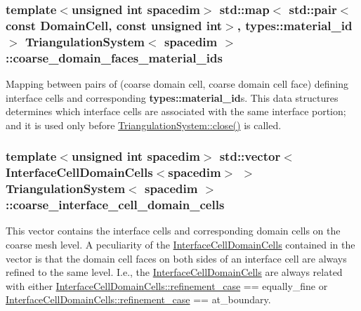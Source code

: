 \subsubsection[{\texorpdfstring{coarse\+\_\+domain\+\_\+faces\+\_\+material\+\_\+ids}{coarse_domain_faces_material_ids}}]{\setlength{\rightskip}{0pt plus 5cm}template$<$unsigned int spacedim$>$ std\+::map$<$ std\+::pair$<$const {\bf Domain\+Cell}, const unsigned int$>$, {\bf types\+::material\+\_\+id} $>$ {\bf Triangulation\+System}$<$ spacedim $>$\+::coarse\+\_\+domain\+\_\+faces\+\_\+material\+\_\+ids\hspace{0.3cm}{\ttfamily [private]}}\hypertarget{class_triangulation_system_a9a14a8a68bda679330a169413f0e2dfb}{}\label{class_triangulation_system_a9a14a8a68bda679330a169413f0e2dfb}
Mapping between pairs of (coarse domain cell, coarse domain cell face) defining interface cells and corresponding {\bf types\+::material\+\_\+id}s. This data structures determines which interface cells are associated with the same interface portion; and it is used only before \hyperlink{class_triangulation_system_ad3605f3f59fbd55942288026107c4e6d}{Triangulation\+System\+::close()} is called. 
\subsubsection[{\texorpdfstring{coarse\+\_\+interface\+\_\+cell\+\_\+domain\+\_\+cells}{coarse_interface_cell_domain_cells}}]{\setlength{\rightskip}{0pt plus 5cm}template$<$unsigned int spacedim$>$ std\+::vector$<${\bf Interface\+Cell\+Domain\+Cells}$<$spacedim$>$ $>$ {\bf Triangulation\+System}$<$ spacedim $>$\+::coarse\+\_\+interface\+\_\+cell\+\_\+domain\+\_\+cells\hspace{0.3cm}{\ttfamily [private]}}\hypertarget{class_triangulation_system_a5b909c472fe2508da44e89b017aa146c}{}\label{class_triangulation_system_a5b909c472fe2508da44e89b017aa146c}
This vector contains the interface cells and corresponding domain cells on the coarse mesh level. A peculiarity of the \hyperlink{class_interface_cell_domain_cells}{Interface\+Cell\+Domain\+Cells} contained in the vector is that the domain cell faces on both sides of an interface cell are always refined to the same level. I.\+e., the \hyperlink{class_interface_cell_domain_cells}{Interface\+Cell\+Domain\+Cells} are always related with either \hyperlink{class_interface_cell_domain_cells_ab1b5469ca5c40256942ea179abbba92c}{Interface\+Cell\+Domain\+Cells\+::refinement\+\_\+case} == {\ttfamily equally\+\_\+fine} or \hyperlink{class_interface_cell_domain_cells_ab1b5469ca5c40256942ea179abbba92c}{Interface\+Cell\+Domain\+Cells\+::refinement\+\_\+case} == {\ttfamily at\+\_\+boundary}. 
